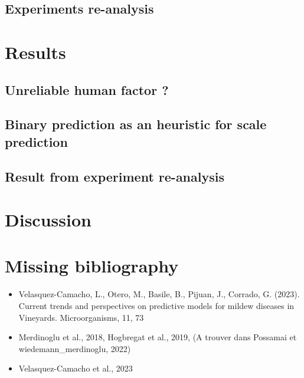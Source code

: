\documentclass[english]{article}
\begin{document}
\subsection{Experiments re-analysis}

\section{Results}

\subsection{Unreliable human factor \textbf{?}}

\subsection{Binary prediction as an heuristic for scale prediction}

\subsection{Result from experiment re-analysis}

\section{Discussion}

\section{Missing bibliography}

\begin{itemize}
    \item Velasquez-Camacho, L., Otero, M., Basile, B., Pijuan, J., Corrado, G. (2023). Current trends and perspectives on predictive models for mildew diseases in Vineyards. Microorganisms, 11, 73
    \item Merdinoglu et al., 2018, Hogbregat et al., 2019, (A trouver dans Possamai et wiedemann\_merdinoglu, 2022)
    \item Velasquez-Camacho et al., 2023
\end{itemize}




\printbibliography
\end{document}
